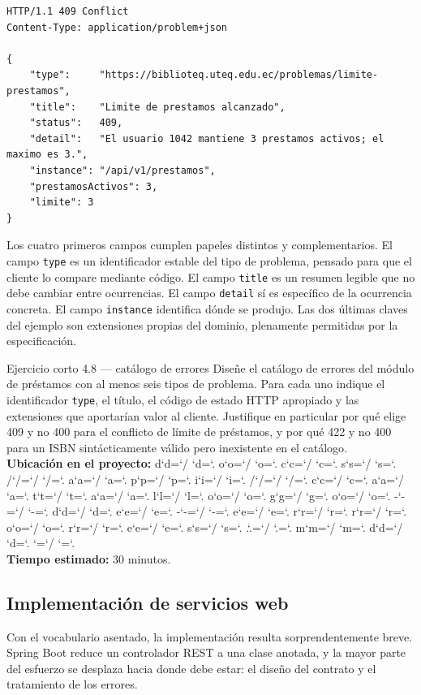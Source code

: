 \documentclass[11pt,a4paper,openany]{book}
\newcommand{\ruta}[1]{{\ttfamily\small\rutaaux #1\relax}}
\def\rutaaux{\futurelet\next\rutapaso}
\def\rutapaso{%
	\ifx\next\relax \let\sig\relax
	\else \let\sig\rutaimprime \fi \sig}
\def\rutaimprime#1{%
	#1\ifnum`#1=`/ \allowbreak\fi
	\ifnum`#1=`. \allowbreak\fi
	\rutaaux}
\begin{document}
\begin{lstlisting}[style=js,caption={Respuesta de error conforme al formato de detalle de problema.},label={lst:u4:problem}]
HTTP/1.1 409 Conflict
Content-Type: application/problem+json

{
	"type":     "https://biblioteq.uteq.edu.ec/problemas/limite-prestamos",
	"title":    "Limite de prestamos alcanzado",
	"status":   409,
	"detail":   "El usuario 1042 mantiene 3 prestamos activos; el maximo es 3.",
	"instance": "/api/v1/prestamos",
	"prestamosActivos": 3,
	"limite": 3
}
\end{lstlisting}

Los cuatro primeros campos cumplen papeles distintos y complementarios. El campo \texttt{type} es un identificador estable del tipo de problema, pensado para que el cliente lo compare mediante código. El campo \texttt{title} es un resumen legible que no debe cambiar entre ocurrencias. El campo \texttt{detail} sí es específico de la ocurrencia concreta. El campo \texttt{instance} identifica dónde se produjo. Las dos últimas claves del ejemplo son extensiones propias del dominio, plenamente permitidas por la especificación.

\begin{cajaejercicio}{Ejercicio corto 4.8 --- catálogo de errores}
	Diseñe el catálogo de errores del módulo de préstamos con al menos seis tipos de problema. Para cada uno indique el identificador \texttt{type}, el título, el código de estado HTTP apropiado y las extensiones que aportarían valor al cliente. Justifique en particular por qué elige 409 y no 400 para el conflicto de límite de préstamos, y por qué 422 y no 400 para un ISBN sintácticamente válido pero inexistente en el catálogo.\\[3pt]
	\textbf{Ubicación en el proyecto:} \ruta{docs/api/catalogo-de-errores.md}\\[3pt]
	\textbf{Tiempo estimado:} 30 minutos.
\end{cajaejercicio}

\subsection{Implementación de servicios web}
\label{sec:u4:implementacion}

Con el vocabulario asentado, la implementación resulta sorprendentemente breve. Spring Boot reduce un controlador REST a una clase anotada, y la mayor parte del esfuerzo se desplaza hacia donde debe estar: el diseño del contrato y el tratamiento de los errores.
\end{document}
